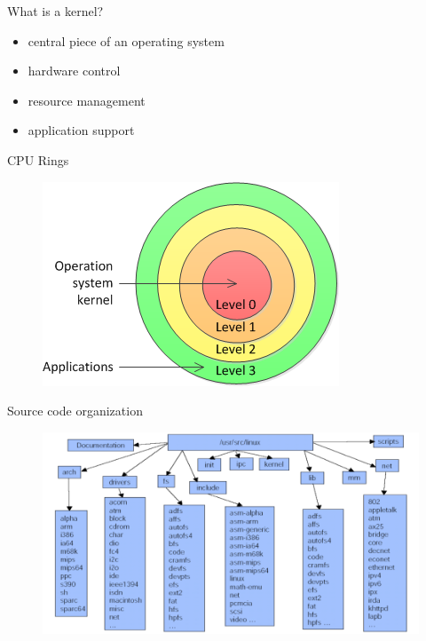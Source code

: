 \documentclass{workshop}
\begin{document}
\begin{frame}{What is a kernel?}
	\begin{itemize}
	\item central piece of an operating system
	\item hardware control
	\item resource management
	\item application support
	\end{itemize}
\end{frame}

\begin{frame}{CPU Rings}
\begin{figure}
  \includegraphics[scale=0.8]{img/privilege-level-en.png}
\end{figure}
\end{frame}

\begin{frame}{Source code organization}

\begin{figure}
  \includegraphics[scale=0.3]{img/source-org.png}
\end{figure}

\end{frame}
\end{document}
